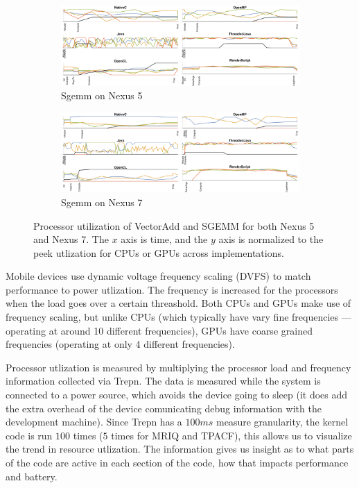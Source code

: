 \begin{figure}[htp]
  \begin{subfigure}[b]{0.85\textwidth}
       \centering
       \includegraphics[width=\textwidth]{data/load_sgemm_nexus5.pdf}
       \caption{Sgemm on Nexus 5}\label{fig:Sgemm5}
   \end{subfigure}
  \begin{subfigure}[b]{0.85\textwidth}
       \centering
       \includegraphics[width=\textwidth]{data/load_sgemm_nexus7.pdf}
       \caption{Sgemm on Nexus 7}\label{fig:Sgemm7}
   \end{subfigure}


  \caption{Processor utilization of VectorAdd and SGEMM for both Nexus 5 and Nexus 7. The $x$ axis is time, and the $y$ axis is normalized to the peek utlization for CPUs or GPUs across implementations.}
  \label{fig:loadVecAddSgemm}
\end{figure}
\FloatBarrier

Mobile devices use dynamic voltage frequency scaling (DVFS)
  to match performance to power utlization.
The frequency is increased for the processors when the load goes over a certain
  threashold.
Both CPUs and GPUs make use of frequency scaling, but unlike CPUs (which typically
  have vary fine frequencies --- operating at around 10 different frequencies), GPUs
  have coarse grained frequencies (operating at only 4 different frequencies).  

Processor utlization is measured by multiplying the processor
  load and frequency information collected via Trepn.
The data is measured while the system is connected to a
  power source, which avoids the device going to sleep (it does add the
  extra overhead of the device comunicating debug information with the development
  machine).
Since Trepn has a $100ms$ measure granularity, the kernel code is run $100$ times
  ($5$ times for MRIQ and TPACF), this allows us to visualize the trend in resource
  utlization.
The information gives us insight as to what parts of the code are active in each
	section of the code, how that impacts performance and battery.


